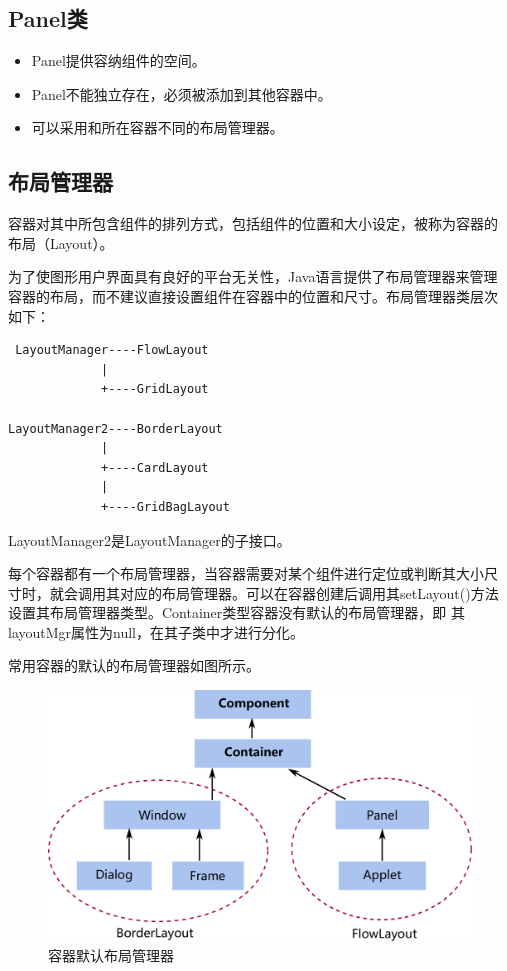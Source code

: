 \subsection{Panel类}

\begin{itemize}
\item Panel提供容纳组件的空间。
\item Panel不能独立存在，必须被添加到其他容器中。
\item 可以采用和所在容器不同的布局管理器。
\end{itemize}


\subsection{布局管理器}

容器对其中所包含组件的排列方式，包括组件的位置和大小设定，被称为容器的
布局（Layout）。

为了使图形用户界面具有良好的平台无关性，Java语言提供了布局管理器来管理
容器的布局，而不建议直接设置组件在容器中的位置和尺寸。布局管理器类层次
如下：

\begin{verbatim}
 LayoutManager----FlowLayout  
             |
             +----GridLayout

LayoutManager2----BorderLayout
             |
             +----CardLayout
             |
             +----GridBagLayout
\end{verbatim}


LayoutManager2是LayoutManager的子接口。


每个容器都有一个布局管理器，当容器需要对某个组件进行定位或判断其大小尺
寸时，就会调用其对应的布局管理器。可以在容器创建后调用其setLayout()方法
设置其布局管理器类型。Container类型容器没有默认的布局管理器，即
其layoutMgr属性为null，在其子类中才进行分化。

常用容器的默认的布局管理器如图所示。

\begin{figure}[htb]
\centering
\includegraphics[width=\textwidth]{images/Java-GUI-programming/fig-AWT-defaut-layout.pdf}
\caption{容器默认布局管理器}
\label{fig:fig-AWT-defaut-layout}
\end{figure}

